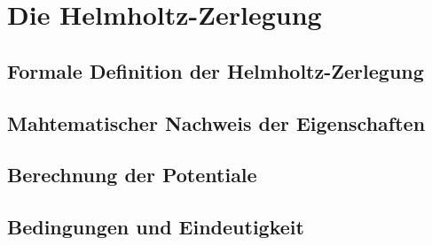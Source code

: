 %
%
%
%
\section{Die Helmholtz-Zerlegung
\label{helmholtz:section:Helmholtz_Zerlegung}}


\subsection{Formale Definition der Helmholtz-Zerlegung
\label{helmholtz:subsection:def_Helmholtz_Zerlegung}}

\subsection{Mahtematischer Nachweis der Eigenschaften
\label{helmholtz:subsection:math_Nachweis}}

\subsection{Berechnung der Potentiale
\label{helmholtz:subsection:Berechnung der Potentiale}}

\subsection{Bedingungen und Eindeutigkeit
\label{helmholtz:subsection:Bedingungen_Eindeutigkeit}}


